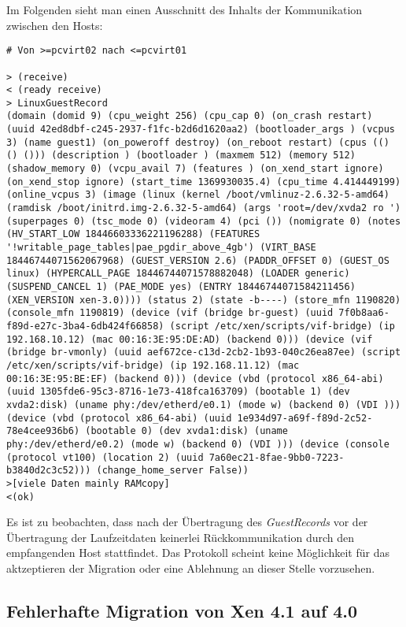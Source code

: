Im Folgenden sieht man einen Ausschnitt des Inhalts der Kommunikation zwischen den Hosts:
\setupVerbatimOut
\begin{verbatim}
# Von >=pcvirt02 nach <=pcvirt01

> (receive)
< (ready receive)
> LinuxGuestRecord
(domain (domid 9) (cpu_weight 256) (cpu_cap 0) (on_crash restart) (uuid 42ed8dbf-c245-2937-f1fc-b2d6d1620aa2) (bootloader_args ) (vcpus 3) (name guest1) (on_poweroff destroy) (on_reboot restart) (cpus (() () ())) (description ) (bootloader ) (maxmem 512) (memory 512) (shadow_memory 0) (vcpu_avail 7) (features ) (on_xend_start ignore) (on_xend_stop ignore) (start_time 1369930035.4) (cpu_time 4.414449199) (online_vcpus 3) (image (linux (kernel /boot/vmlinuz-2.6.32-5-amd64) (ramdisk /boot/initrd.img-2.6.32-5-amd64) (args 'root=/dev/xvda2 ro ') (superpages 0) (tsc_mode 0) (videoram 4) (pci ()) (nomigrate 0) (notes (HV_START_LOW 18446603336221196288) (FEATURES '!writable_page_tables|pae_pgdir_above_4gb') (VIRT_BASE 18446744071562067968) (GUEST_VERSION 2.6) (PADDR_OFFSET 0) (GUEST_OS linux) (HYPERCALL_PAGE 18446744071578882048) (LOADER generic) (SUSPEND_CANCEL 1) (PAE_MODE yes) (ENTRY 18446744071584211456) (XEN_VERSION xen-3.0)))) (status 2) (state -b----) (store_mfn 1190820) (console_mfn 1190819) (device (vif (bridge br-guest) (uuid 7f0b8aa6-f89d-e27c-3ba4-6db424f66858) (script /etc/xen/scripts/vif-bridge) (ip 192.168.10.12) (mac 00:16:3E:95:DE:AD) (backend 0))) (device (vif (bridge br-vmonly) (uuid aef672ce-c13d-2cb2-1b93-040c26ea87ee) (script /etc/xen/scripts/vif-bridge) (ip 192.168.11.12) (mac 00:16:3E:95:BE:EF) (backend 0))) (device (vbd (protocol x86_64-abi) (uuid 1305fde6-95c3-8716-1e73-418fca163709) (bootable 1) (dev xvda2:disk) (uname phy:/dev/etherd/e0.1) (mode w) (backend 0) (VDI ))) (device (vbd (protocol x86_64-abi) (uuid 1e934d97-a69f-f89d-2c52-78e4cee936b6) (bootable 0) (dev xvda1:disk) (uname phy:/dev/etherd/e0.2) (mode w) (backend 0) (VDI ))) (device (console (protocol vt100) (location 2) (uuid 7a60ec21-8fae-9bb0-7223-b3840d2c3c52))) (change_home_server False))
>[viele Daten mainly RAMcopy]
<(ok)
\end{verbatim}

Es ist zu beobachten, dass nach der Übertragung des \emph{GuestRecords} vor der Übertragung der Laufzeitdaten keinerlei Rückkommunikation durch den empfangenden Host stattfindet. Das Protokoll scheint keine Möglichkeit für das aktzeptieren der Migration oder eine Ablehnung an dieser Stelle vorzusehen.

\subsection{Fehlerhafte Migration von Xen 4.1 auf 4.0}


